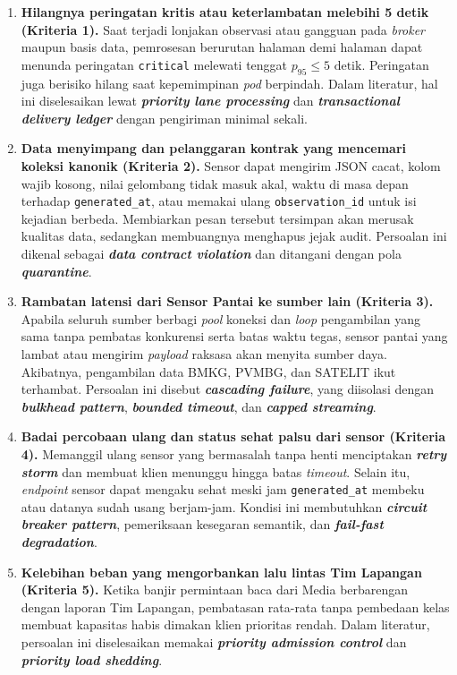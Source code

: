 \begin{enumerate}
  \item \textbf{Hilangnya peringatan kritis atau keterlambatan melebihi 5 detik (Kriteria 1).}
  Saat terjadi lonjakan observasi atau gangguan pada \textit{broker} maupun basis data, pemrosesan berurutan halaman demi halaman dapat menunda peringatan \texttt{critical} melewati tenggat $p_{95} \le 5\text{ detik}$. Peringatan juga berisiko hilang saat kepemimpinan \textit{pod} berpindah. Dalam literatur, hal ini diselesaikan lewat \textbf{\textit{priority lane processing}} dan \textbf{\textit{transactional delivery ledger}} dengan pengiriman minimal sekali.

  \item \textbf{Data menyimpang dan pelanggaran kontrak yang mencemari koleksi kanonik (Kriteria 2).}
  Sensor dapat mengirim JSON cacat, kolom wajib kosong, nilai gelombang tidak masuk akal, waktu di masa depan terhadap \texttt{generated\_at}, atau memakai ulang \texttt{observation\_id} untuk isi kejadian berbeda. Membiarkan pesan tersebut tersimpan akan merusak kualitas data, sedangkan membuangnya menghapus jejak audit. Persoalan ini dikenal sebagai \textbf{\textit{data contract violation}} dan ditangani dengan pola \textbf{\textit{quarantine}}.

  \item \textbf{Rambatan latensi dari Sensor Pantai ke sumber lain (Kriteria 3).}
  Apabila seluruh sumber berbagi \textit{pool} koneksi dan \textit{loop} pengambilan yang sama tanpa pembatas konkurensi serta batas waktu tegas, sensor pantai yang lambat atau mengirim \textit{payload} raksasa akan menyita sumber daya. Akibatnya, pengambilan data BMKG, PVMBG, dan SATELIT ikut terhambat. Persoalan ini disebut \textbf{\textit{cascading failure}}, yang diisolasi dengan \textbf{\textit{bulkhead pattern}}, \textbf{\textit{bounded timeout}}, dan \textbf{\textit{capped streaming}}.

  \item \textbf{Badai percobaan ulang dan status sehat palsu dari sensor (Kriteria 4).}
  Memanggil ulang sensor yang bermasalah tanpa henti menciptakan \textbf{\textit{retry storm}} dan membuat klien menunggu hingga batas \textit{timeout}. Selain itu, \textit{endpoint}  sensor dapat mengaku sehat meski jam \texttt{generated\_at} membeku atau datanya sudah usang berjam-jam. Kondisi ini membutuhkan \textbf{\textit{circuit breaker pattern}}, pemeriksaan kesegaran semantik, dan \textbf{\textit{fail-fast degradation}}.

  \item \textbf{Kelebihan beban yang mengorbankan lalu lintas Tim Lapangan (Kriteria 5).}
  Ketika banjir permintaan baca dari Media berbarengan dengan laporan Tim Lapangan, pembatasan rata-rata tanpa pembedaan kelas membuat kapasitas habis dimakan klien prioritas rendah. Dalam literatur, persoalan ini diselesaikan memakai \textbf{\textit{priority admission control}} dan \textbf{\textit{priority load shedding}}.
\end{enumerate}

